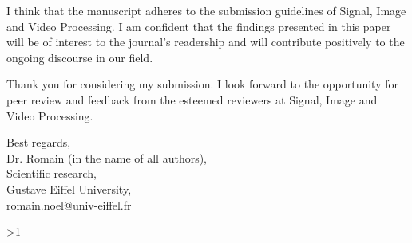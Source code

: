 \documentclass{article}
\newcommand{\Pathbasebib}{\PathR/ref_RN.bib,\PathR/ref_XX.bib}%
\begin{document}
	I think %
	that the manuscript adheres to the submission guidelines of {Signal, Image and Video Processing}.
	I am confident that the findings presented in this paper will be of interest to the journal's readership and will contribute positively to the ongoing discourse in our field.

	Thank you for considering my submission.
	I look forward to the opportunity for peer review and feedback from the esteemed reviewers at {Signal, Image and Video Processing}.

	\begin{flushright}
		Best regards, \\
		Dr. Romain  (in the name of all authors), \\
		Scientific research, \\
		Gustave Eiffel University, \\
		romain.noel@univ-eiffel.fr
	\end{flushright}

\ifnum\value{levelstanda}>1
	{}%
\else


\fi

\addtocounter{levelstanda}{-1}
\end{document}
